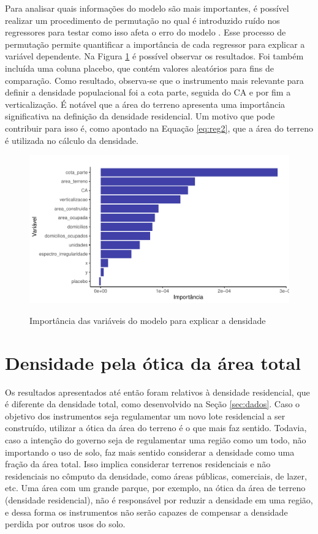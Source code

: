 Para analisar quais informações do modelo são mais importantes, é possível realizar um procedimento de permutação no qual é introduzido ruído nos regressores para testar como isso afeta o erro do modelo \cite{breiman2001random, Nembrini2018}. Esse processo de permutação permite quantificar a importância de cada regressor para explicar a variável dependente. Na Figura \ref{fig:importancia} é possível observar os resultados. Foi também incluída uma coluna placebo, que contém valores aleatórios para fins de comparação. Como resultado, observa-se que o instrumento mais relevante para definir a densidade populacional foi a cota parte, seguida do CA e por fim a verticalização. É notável que a área do terreno apresenta uma importância significativa na definição da densidade residencial. Um motivo que pode contribuir para isso é, como apontado na Equação \ref{eq:reg2}, que a área do terreno é utilizada no cálculo da densidade.

\begin{figure}[h]
    \centering
    \caption{Importância das variáveis do modelo para explicar a densidade}
    \includegraphics[width = .95\linewidth]{imagens/var_importance.pdf}
    \label{fig:importancia}
\end{figure}

\section{Densidade pela ótica da área total}

Os resultados apresentados até então foram relativos à densidade residencial, que é diferente da densidade total, como desenvolvido na Seção \ref{sec:dados}. Caso o objetivo dos instrumentos seja regulamentar um novo lote residencial a ser construído, utilizar a ótica da área do terreno é o que mais faz sentido. Todavia, caso a intenção do governo seja de regulamentar uma região como um todo, não importando o uso de solo, faz mais sentido considerar a densidade como uma fração da área total. Isso implica considerar terrenos residenciais e não residenciais no cômputo da densidade, como áreas públicas, comerciais, de lazer, etc. Uma área com um grande parque, por exemplo, na ótica da área de terreno (densidade residencial), não é responsável por reduzir a densidade em uma região, e dessa forma os instrumentos não serão capazes de compensar a densidade perdida por outros usos do solo. 

